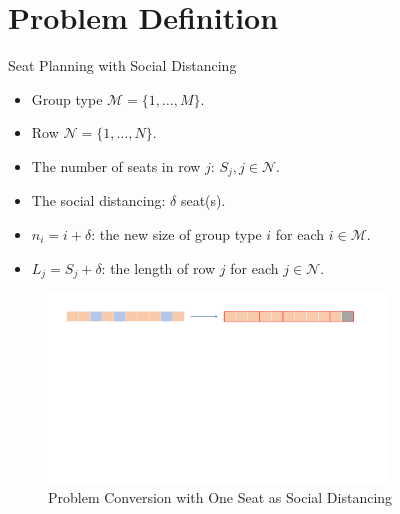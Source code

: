 
\section{Problem Definition}
    \frame{\sectionpage}

    \begin{frame}{Seat Planning with Social Distancing}
      \begin{itemize}
      \item Group type $\mathcal{M} = \{1, \ldots, M\}$.
      \item Row $\mathcal{N} = \{1, \ldots, N\}$.
      \item The number of seats in row $j$: $S_j, j \in \mathcal{N}$.
      \item The social distancing: $\delta$ seat(s).
      \item $n_i = i + \delta$: the new size of group type $i$ for each $i \in \mathcal{M}$.
      \item $L_j = S_j + \delta$: the length of row $j$ for each $j \in \mathcal{N}$.
      \end{itemize}
      
      \begin{figure}[ht]
        \centering
        \includegraphics[width = 0.8\textwidth]{./images/dummy_seat.pdf}
        \caption{Problem Conversion with One Seat as Social Distancing}
    \end{figure}
    \end{frame}

